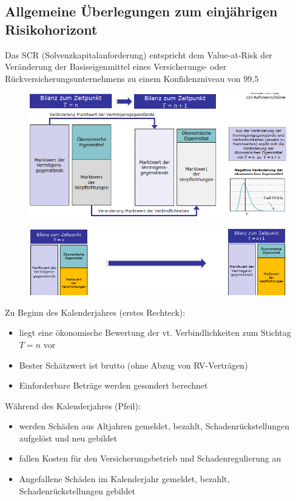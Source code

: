 \documentclass[12pt]{report}
\theoremstyle{dotless}
\theoremstyle{definition}
\begin{document}
\subsection{Allgemeine Überlegungen zum einjährigen Risikohorizont}
Das SCR (Solvenzkapitalanforderung) entspricht dem Value-at-Risk der Veränderung der
Basiseigenmittel eines Versicherungs- oder Rückversicherungsunternehmens zu einem
Konfidenzniveau von 99,5 %

\begin{figure}[ht]
	\centering
	\includegraphics[width= \textwidth]{Bilder/SCR.png}
\end{figure}

\begin{figure}[ht]
	\centering
	\includegraphics[width= \textwidth]{Bilder/Risikohorizont.png}
\end{figure}



Zu Beginn des Kalenderjahres (erstes Rechteck):
\begin{itemize}
\item liegt eine ökonomische Bewertung der vt. Verbindlichkeiten zum Stichtag $T=n$ vor
\item Bester Schätzwert ist brutto (ohne Abzug von RV-Verträgen)
\item Einforderbare Beträge werden gesondert berechnet
\end{itemize}



Während des Kalenderjahres (Pfeil):
\begin{itemize}
\item werden Schäden aus Altjahren gemeldet, bezahlt, Schadenrückstellungen aufgelöst und neu gebildet
\item fallen Kosten für den Versicherungsbetrieb und Schadenregulierung an
\item Angefallene Schäden im Kalenderjahr gemeldet,  bezahlt, Schadenrückstellungen  gebildet
\end{itemize}
\end{document}
